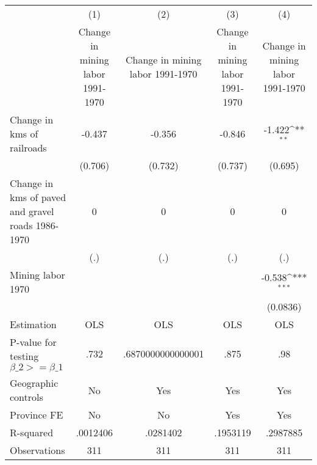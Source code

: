 {
\def\sym#1{\ifmmode^{#1}\else\(^{#1}\)\fi}
\begin{tabular}{l*{4}{c}}
\hline\hline
                &\multicolumn{1}{c}{(1)}&\multicolumn{1}{c}{(2)}&\multicolumn{1}{c}{(3)}&\multicolumn{1}{c}{(4)}\\
                &\multicolumn{1}{c}{Change in mining labor 1991-1970}&\multicolumn{1}{c}{Change in mining labor 1991-1970}&\multicolumn{1}{c}{Change in mining labor 1991-1970}&\multicolumn{1}{c}{Change in mining labor 1991-1970}\\
\hline
Change in kms of railroads&   -0.437         &   -0.356         &   -0.846         &   -1.422\sym{**} \\
                &  (0.706)         &  (0.732)         &  (0.737)         &  (0.695)         \\
[1em]
Change in kms of paved and gravel roads 1986-1970&        0         &        0         &        0         &        0         \\
                &      (.)         &      (.)         &      (.)         &      (.)         \\
[1em]
Mining labor 1970&                  &                  &                  &   -0.538\sym{***}\\
                &                  &                  &                  & (0.0836)         \\
\hline
Estimation      &      OLS         &      OLS         &      OLS         &      OLS         \\
P-value for testing $\beta\_2 >= \beta\_1$&     .732         &.6870000000000001         &     .875         &      .98         \\
Geographic controls&       No         &      Yes         &      Yes         &      Yes         \\
Province FE     &       No         &       No         &      Yes         &      Yes         \\
R-squared       & .0012406         & .0281402         & .1953119         & .2987885         \\
Observations    &      311         &      311         &      311         &      311         \\
\hline\hline
\end{tabular}
}
